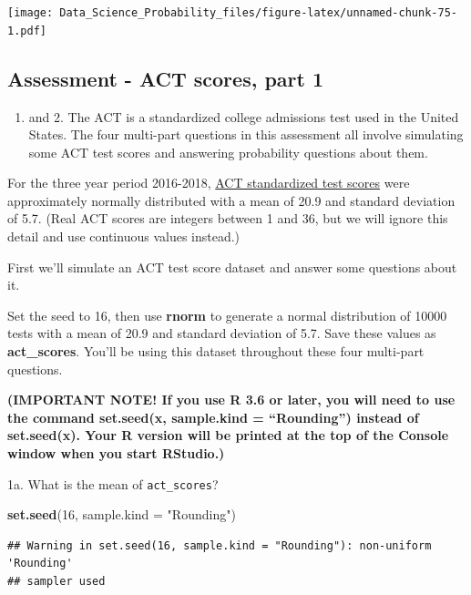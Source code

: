 \documentclass[
]{article}
\newenvironment{Shaded}{\begin{snugshade}}{\end{snugshade}}
\newcommand{\DataTypeTok}[1]{\textcolor[rgb]{0.13,0.29,0.53}{#1}}
\newcommand{\DecValTok}[1]{\textcolor[rgb]{0.00,0.00,0.81}{#1}}
\newcommand{\KeywordTok}[1]{\textcolor[rgb]{0.13,0.29,0.53}{\textbf{#1}}}
\newcommand{\NormalTok}[1]{#1}
\newcommand{\StringTok}[1]{\textcolor[rgb]{0.31,0.60,0.02}{#1}}
\providecommand{\tightlist}{%
  \setlength{\itemsep}{0pt}\setlength{\parskip}{0pt}}
\begin{document}
\texttt{[image: Data\_Science\_Probability\_files/figure-latex/unnamed-chunk-75-1.pdf]}

\hypertarget{assessment---act-scores-part-1}{%
\subsection{Assessment - ACT scores, part
1}\label{assessment---act-scores-part-1}}

\begin{enumerate}
\def\labelenumi{\arabic{enumi}.}
\tightlist
\item
  and 2. The ACT is a standardized college admissions test used in the
  United States. The four multi-part questions in this assessment all
  involve simulating some ACT test scores and answering probability
  questions about them.
\end{enumerate}

For the three year period 2016-2018,
\href{http://www.act.org/content/act/en/products-and-services/the-act/scores/national-ranks.html}{ACT
standardized test scores} were approximately normally distributed with a
mean of 20.9 and standard deviation of 5.7. (Real ACT scores are
integers between 1 and 36, but we will ignore this detail and use
continuous values instead.)

First we'll simulate an ACT test score dataset and answer some questions
about it.

Set the seed to 16, then use \textbf{rnorm} to generate a normal
distribution of 10000 tests with a mean of 20.9 and standard deviation
of 5.7. Save these values as \textbf{act\_scores}. You'll be using this
dataset throughout these four multi-part questions.

\textbf{(IMPORTANT NOTE! If you use R 3.6 or later, you will need to use
the command set.seed(x, sample.kind = ``Rounding'') instead of
set.seed(x). Your R version will be printed at the top of the Console
window when you start RStudio.)}

1a. What is the mean of \texttt{act\_scores}?

\begin{Shaded}
\begin{Highlighting}[]
\KeywordTok{set.seed}\NormalTok{(}\DecValTok{16}\NormalTok{, }\DataTypeTok{sample.kind =} \StringTok{"Rounding"}\NormalTok{)}
\end{Highlighting}
\end{Shaded}

\begin{verbatim}
## Warning in set.seed(16, sample.kind = "Rounding"): non-uniform 'Rounding'
## sampler used
\end{verbatim}
\end{document}
